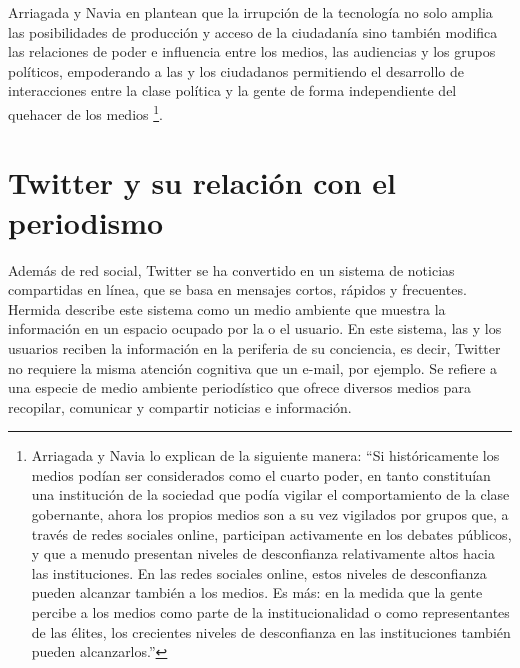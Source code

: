 Arriagada y Navia en \cite{intermedio2013} plantean que la irrupción de la tecnología no solo amplia las posibilidades de producción y acceso de la ciudadanía sino también modifica las relaciones de poder e influencia entre los medios, las audiencias y los grupos políticos, empoderando a las y los ciudadanos permitiendo el desarrollo de interacciones entre la clase política y la gente de forma independiente del quehacer de los medios \footnote{ Arriagada y Navia lo explican de la siguiente manera: ``Si históricamente los medios podían ser considerados como el cuarto poder, en tanto constituían una institución de la sociedad que podía vigilar el comportamiento de la clase gobernante, ahora los propios medios son a su vez vigilados por grupos que, a través de redes sociales online, participan activamente en los debates públicos, y que a menudo presentan niveles de desconfianza relativamente altos hacia las instituciones. En las redes sociales online, estos niveles de desconfianza pueden alcanzar también a los medios. Es más: en la medida que la gente percibe a los medios como parte de la institucionalidad o como representantes de las élites, los crecientes niveles de desconfianza en las instituciones también pueden alcanzarlos.'' }.
\newpage

\section{Twitter y su relación con el periodismo}

Además de red social, Twitter se ha convertido en un sistema de noticias compartidas en línea, que se basa en mensajes cortos, rápidos y frecuentes. Hermida \cite{hermida2010twittering}
describe este sistema como un medio ambiente que muestra la información en un espacio ocupado por la o el usuario.
En este sistema, las y los usuarios reciben la información en la periferia de su conciencia, es decir, Twitter no requiere la misma atención cognitiva que un e-mail, por ejemplo. Se refiere a una especie de medio ambiente periodístico que ofrece diversos medios para recopilar, comunicar y compartir noticias e información. 


